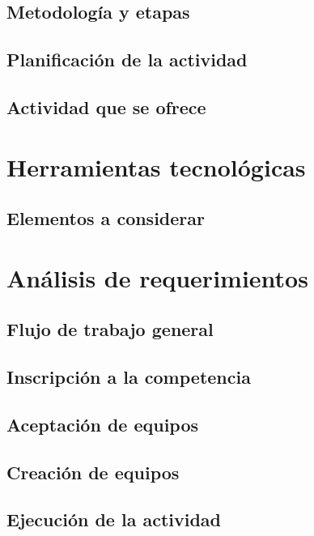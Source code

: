 \documentclass{article}
\begin{document}
\subsection{Metodología y etapas}

\subsection{Planificación de la actividad}

\subsection{Actividad que se ofrece}

\section{Herramientas tecnológicas}

\subsection{Elementos a considerar}

\section{Análisis de requerimientos}

\subsection{Flujo de trabajo general}

\subsection{Inscripción a la competencia}

\subsection{Aceptación de equipos}

\subsection{Creación de equipos}

\subsection{Ejecución de la actividad}
\end{document}
